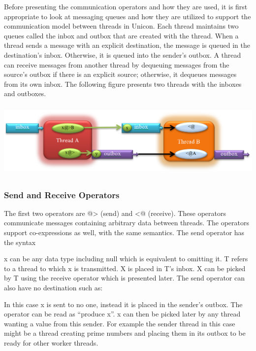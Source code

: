 Before presenting the communication operators and how they are used, it
is first appropriate to look at messaging queues and how they are
utilized to support the communication model between threads in Unicon.
Each thread maintains two queues called the inbox and outbox that are
created with the thread. When a thread sends a message with an explicit
destination, the message is queued in the destination{\textquoteright}s
inbox. Otherwise, it is queued into the sender{\textquoteright}s outbox.
A thread can receive messages from another thread by dequeuing messages
from the source{\textquoteright}s outbox if there is an explicit
source; otherwise, it dequeues messages from its own inbox. The
following figure presents two threads with the inboxes and outboxes.


\bigskip


\includegraphics[width=5.75in,height=1.4807in]{ub-img/thread-fig1.png}

\bigskip

\subsubsection{Send and Receive Operators}

The first two operators are \textsf{@{\textgreater}} (send)
and \textsf{{\textless}@} (receive). These operators
communicate messages containing arbitrary data between threads. The
operators support co-expressions as well, with the same semantics. The
send operator has the syntax 


\textsf{x} can be any data type including null which is
equivalent to omitting it. \textsf{T} refers to a thread to
which \textsf{x} is transmitted. \textsf{X} is
placed in \textsf{T}{\textquoteright}s inbox.
\textsf{X} can be picked by \textsf{T} using the
receive operator which is presented later. The send operator can also
have no destination such as:


In this case \textsf{x} is sent to no one, instead it is
placed in the sender{\textquoteright}s outbox. The operator can be read
as {\textquotedblleft}produce
\textsf{x{\textquotedblright}}. \textsf{x} can
then be picked later by any thread wanting a value from this sender.
For example the sender thread in this case might be a thread creating
prime numbers and placing them in its outbox to be ready for other
worker threads.

